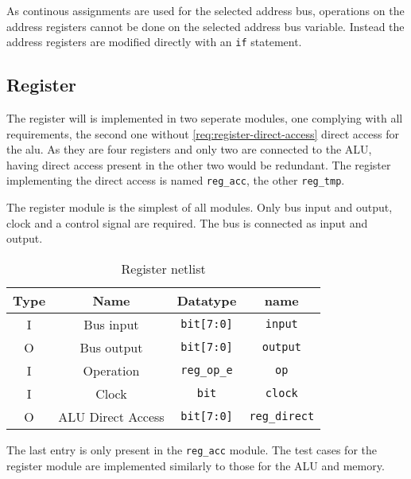 As continous assignments are used for the selected address bus, operations on the address registers cannot be done on the selected address bus variable. Instead the address registers are modified directly with an \texttt{if} statement.


\subsection{Register}
The register will is implemented in two seperate modules, one complying with all requirements, the second one without \ref{req:register-direct-access} direct access for the alu. As they are four registers and only two are connected to the ALU, having direct access present in the other two would be redundant. The register implementing the direct access is named \texttt{reg\_acc}, the other \texttt{reg\_tmp}.

The register module is the simplest of all modules. Only bus input and output, clock and a control signal are required. The bus is connected as input and output.

\begin{table}[H]
  
  \begin{center}
  \begin{tabular}{cccc}
   Type & Name               & Datatype                       & name                          \\ \hline
   I    & Bus input          & \texttt{bit{[}7:0{]}}          & \texttt{input}                \\
   O    & Bus output         & \texttt{bit{[}7:0{]}}          & \texttt{output}               \\
   I    & Operation          & \texttt{reg\_op\_e}         & \texttt{op}                   \\
   I    & Clock              & \texttt{bit}                   & \texttt{clock}               \\
   O    & ALU Direct Access               & \texttt{bit{[}7:0{]}}          & \texttt{reg\_direct}               \\
   \end{tabular}
  \end{center}
   \caption{Register netlist}
   \label{tab:reg-io}
\end{table}

The last entry is only present in the \texttt{reg\_acc} module. The test cases for the register module are implemented similarly to those for the ALU and memory. 

